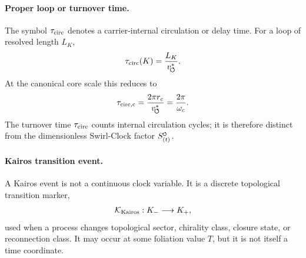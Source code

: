 \documentclass[11pt]{article}
\theoremstyle{definition}
\theoremstyle{plain}
\theoremstyle{remark}
\newcommand{\swirlarrow}{\mathchoice{\mkern-2mu\scriptstyle\boldsymbol{\circlearrowleft}}{\mkern-2mu\scriptstyle\boldsymbol{\circlearrowleft}}{\mkern-2mu\scriptscriptstyle\boldsymbol{\circlearrowleft}}{\mkern-2mu\scriptscriptstyle\boldsymbol{\circlearrowleft}}}
\newcommand{\SwirlClock}{{S_{(t)}^{\swirlarrow}}}
\newcommand{\rc}{{r_c}}
\newcommand{\vchar}{v_{\!\boldsymbol{\circlearrowleft}}^{\ast}}
\begin{document}
        \paragraph{Proper loop or turnover time.}
        The symbol \(\tau_{\rm circ}\) denotes a carrier-internal circulation or
        delay time.  For a loop of resolved length \(L_K\),
        \begin{align}
            \tau_{\rm circ}(K)
            =
            \frac{L_K}{\vchar}.
            \label{eq:canonical_time_ontology_loop_time}
        \end{align}
        At the canonical core scale this reduces to
        \begin{align}
            \tau_{\rm circ,c}
            =
            \frac{2\pi \rc}{\vchar}
            =
            \frac{2\pi}{\omega_c}.
        \end{align}
        The turnover time \(\tau_{\rm circ}\) counts internal circulation cycles; it is
        therefore distinct from the dimensionless Swirl-Clock factor \(\SwirlClock\).

        \paragraph{Kairos transition event.}
        A Kairos event is not a continuous clock variable.  It is a discrete
        topological transition marker,
        \begin{align}
            \mathcal{K}_{\rm Kairos}:
            K_-
            \longrightarrow
            K_+ ,
            \label{eq:canonical_time_ontology_kairos}
        \end{align}
        used when a process changes topological sector, chirality class, closure
        state, or reconnection class.  It may occur at some foliation value \(T\),
        but it is not itself a time coordinate.
\end{document}
